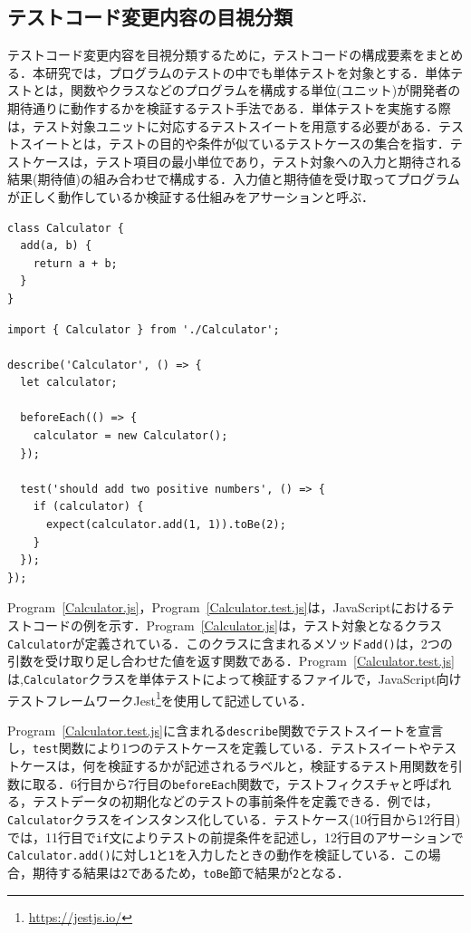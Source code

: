 \documentclass[11pt,dvipdfmx]{jreport}
\begin{document}
\subsection{テストコード変更内容の目視分類}
テストコード変更内容を目視分類するために，テストコードの構成要素をまとめる．本研究では，プログラムのテストの中でも単体テストを対象とする．単体テストとは，関数やクラスなどのプログラムを構成する単位(ユニット)が開発者の期待通りに動作するかを検証するテスト手法である．単体テストを実施する際は，テスト対象ユニットに対応するテストスイートを用意する必要がある．テストスイートとは，テストの目的や条件が似ているテストケースの集合を指す．テストケースは，テスト項目の最小単位であり，テスト対象への入力と期待される結果(期待値)の組み合わせで構成する．入力値と期待値を受け取ってプログラムが正しく動作しているか検証する仕組みをアサーションと呼ぶ．

\begin{lstlisting}[caption=Calculator.js, label=Calculator.js]
class Calculator {
  add(a, b) {
    return a + b;
  }
}
\end{lstlisting}

\begin{lstlisting}[caption=Calculator.test.js, label=Calculator.test.js]
import { Calculator } from './Calculator';

describe('Calculator', () => {
  let calculator;

  beforeEach(() => {
    calculator = new Calculator();
  });

  test('should add two positive numbers', () => {
    if (calculator) {
      expect(calculator.add(1, 1)).toBe(2);
    }
  });
});
\end{lstlisting}


Program~\ref{Calculator.js}，Program~\ref{Calculator.test.js}は，JavaScriptにおけるテストコードの例を示す．Program~\ref{Calculator.js}は，テスト対象となるクラス{\verb|Calculator|}が定義されている．このクラスに含まれるメソッド{\verb|add()|}は，2つの引数を受け取り足し合わせた値を返す関数である．Program~\ref{Calculator.test.js}は,{\verb|Calculator|}クラスを単体テストによって検証するファイルで，JavaScript向けテストフレームワークJest\footnote{\url{https://jestjs.io/}}を使用して記述している．

Program~\ref{Calculator.test.js}に含まれる{\verb|describe|}関数でテストスイートを宣言し，{\verb|test|}関数により1つのテストケースを定義している．テストスイートやテストケースは，何を検証するかが記述されるラベルと，検証するテスト用関数を引数に取る．6行目から7行目の{\verb|beforeEach|}関数で，テストフィクスチャと呼ばれる，テストデータの初期化などのテストの事前条件を定義できる．例では，{\verb|Calculator|}クラスをインスタンス化している．テストケース(10行目から12行目)では，11行目で{\verb|if|}文によりテストの前提条件を記述し，12行目のアサーションで{\verb|Calculator.add()|}に対し{\verb|1|}と{\verb|1|}を入力したときの動作を検証している．この場合，期待する結果は{\verb|2|}であるため，{\verb|toBe|}節で結果が{\verb|2|}となる．
\end{document}
